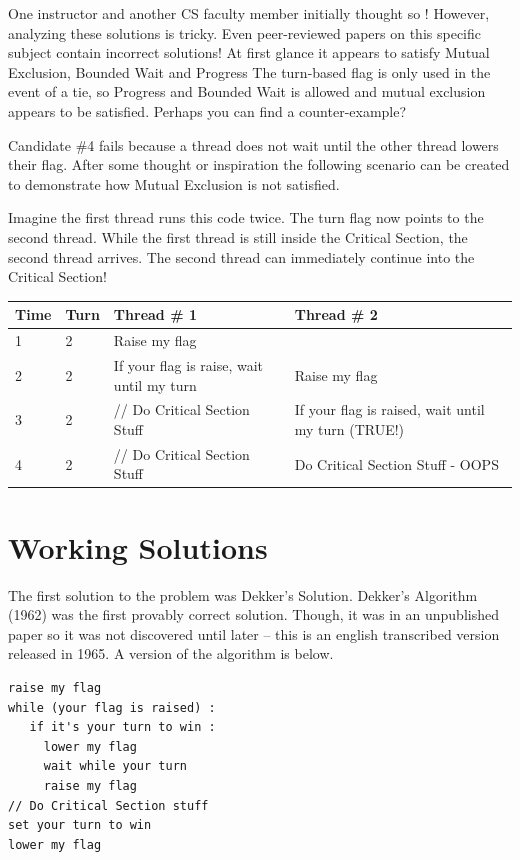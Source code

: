One instructor and another CS faculty member initially thought so !
However, analyzing these solutions is tricky.
Even peer-reviewed papers on this specific subject contain incorrect solutions!
At first glance it appears to satisfy Mutual Exclusion, Bounded Wait and Progress
The turn-based flag is only used in the event of a tie, so Progress and Bounded Wait is allowed and mutual exclusion appears to be satisfied.
Perhaps you can find a counter-example?

Candidate \#4 fails because a thread does not wait until the other thread lowers their flag.
After some thought or inspiration the following scenario can be created to demonstrate how Mutual Exclusion is not satisfied.

Imagine the first thread runs this code twice.
The turn flag now points to the second thread.
While the first thread is still inside the Critical Section, the second thread arrives.
The second thread can immediately continue into the Critical Section!

\begin{tabular}{|l|l|l|l|}
Time & Turn & Thread \# 1 & Thread \# 2 \\ \hline
1 & 2 & Raise my flag & \\
2 & 2 & If your flag is raise, wait until my turn & Raise my flag \\
3 & 2 & // Do Critical Section Stuff & If your flag is raised, wait until my turn (TRUE!) \\
4 & 2 & // Do Critical Section Stuff & Do Critical Section Stuff - OOPS \\
\end{tabular}

\section{Working Solutions}

The first solution to the problem was Dekker's Solution.
Dekker's Algorithm (1962) was the first provably correct solution.
Though, it was in an unpublished paper so it was not discovered until later \cite{dekker_dijkstra_1965} -- this is an english transcribed version released in 1965.
A version of the algorithm is below.

\begin{lstlisting}
raise my flag
while (your flag is raised) :
   if it's your turn to win :
     lower my flag
     wait while your turn
     raise my flag
// Do Critical Section stuff
set your turn to win
lower my flag
\end{lstlisting}

